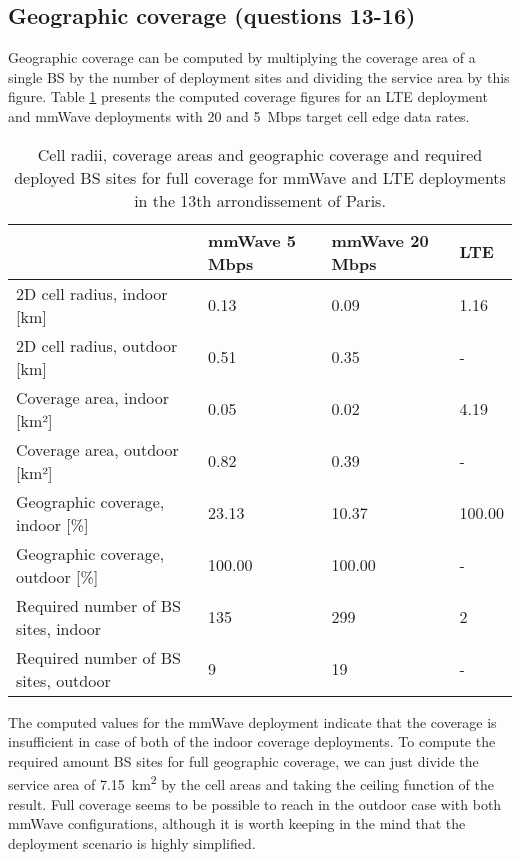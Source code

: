 \documentclass{article}
\begin{document}
\subsection{Geographic coverage (questions 13-16)}
Geographic coverage can be computed by multiplying the coverage area of a single BS by the number of deployment sites and dividing the service area by this figure. Table \ref{tab:coverage} presents the computed coverage figures for an LTE deployment and mmWave deployments with 20 and 5\ Mbps target cell edge data rates.

\begin{table}[!htb]
    \centering
    \begin{tabular}{|l|l|l|l|}
    \hline
    \textbf{}                             & \textbf{mmWave 5 Mbps} & \textbf{mmWave 20 Mbps} & \textbf{LTE} \\ \hline
    2D cell radius, indoor {[}km{]}       & 0.13                   & 0.09                    & 1.16         \\ \hline
    2D cell radius, outdoor {[}km{]}      & 0.51                   & 0.35                    & -            \\ \hline
    Coverage area, indoor {[}km²{]}       & 0.05                   & 0.02                    & 4.19         \\ \hline
    Coverage area, outdoor {[}km²{]}      & 0.82                   & 0.39                    & -            \\ \hline
    Geographic coverage, indoor {[}\%{]}  & 23.13                  & 10.37                   & 100.00       \\ \hline
    Geographic coverage, outdoor {[}\%{]} & 100.00                 & 100.00                  & -            \\ \hline
    Required number of BS sites, indoor   & 135                    & 299                     & 2            \\ \hline
    Required number of BS sites, outdoor  & 9                      & 19                      & -            \\ \hline
    \end{tabular}
    \caption{Cell radii, coverage areas and geographic coverage and required deployed BS sites for full coverage for mmWave and LTE deployments in the 13th arrondissement of Paris.}
    \label{tab:coverage}
\end{table}

The computed values for the mmWave deployment indicate that the coverage is insufficient in case of both of the indoor coverage deployments. To compute the required amount BS sites for full geographic coverage, we can just divide the service area of \SI{7.15}{\kilo\metre\squared} by the cell areas and taking the ceiling function of the result. Full coverage seems to be possible to reach in the outdoor case with both mmWave configurations, although it is worth keeping in the mind that the deployment scenario is highly simplified.
\end{document}
